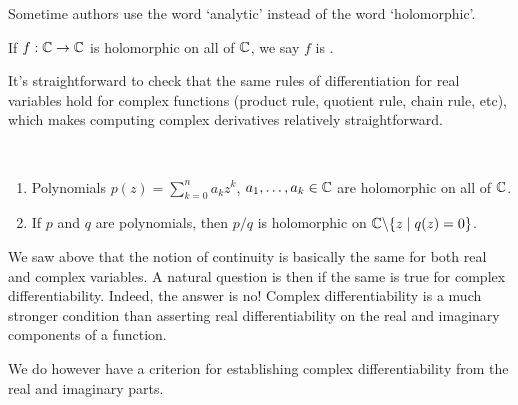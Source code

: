 \documentclass[a4paper]{scrartcl}
\begin{document}
\begin{remark}
    Sometime authors use the word `analytic' instead of the word `holomorphic'.
\end{remark}

\begin{definition}[Entire]
    If $f: \mathbb{C} \rightarrow \mathbb{C}$ is holomorphic on all of $\mathbb{C}$, we say $f$ is .
\end{definition}



It's straightforward to check that the same rules of differentiation for real variables hold for complex functions (product rule, quotient rule, chain rule, etc), which makes computing complex derivatives relatively straightforward.

\begin{example}~
    \vspace*{-1.5\baselineskip}
\begin{enumerate}[label=(\roman*)]
    \item Polynomials $p(z) = \sum_{k = 0}^n a_k z^k$, $a_1, \dots, a_k \in \mathbb{C}$ are holomorphic on all of $\mathbb{C}$.
    \item If $p$ and $q$ are polynomials, then $p/q$ is holomorphic on $\mathbb{C} \backslash \{z \mid q(z) = 0\}$.
\end{enumerate}
\end{example}
    
We saw above that the notion of continuity is basically the same for both real and complex variables. A natural question is then if the same is true for complex differentiability.
Indeed, the answer is no! Complex differentiability is a much stronger condition than asserting real differentiability on the real and imaginary components of a function.

We do however have a criterion for establishing complex differentiability from the real and imaginary parts.
\end{document}
